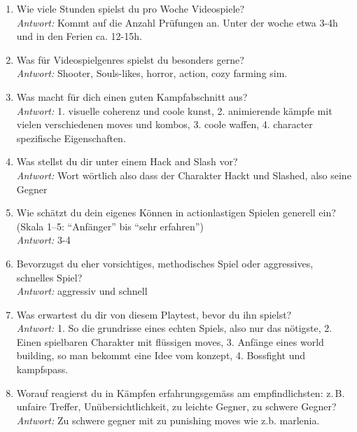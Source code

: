 \documentclass[../Main.tex]{subfiles}
\begin{document}
\begin{enumerate}[label=\textbf{P\arabic*}, leftmargin=1.5cm, itemsep=0.8em]
    \item Wie viele Stunden spielst du pro Woche Videospiele? \\
        \textit{Antwort:} Kommt auf die Anzahl Prüfungen an. Unter der woche etwa 3-4h und in den Ferien ca. 12-15h.

    \item Was für Videospielgenres spielst du besonders gerne? \\
        \textit{Antwort:} Shooter, Souls-likes, horror, action, cozy farming sim.

    \item Was macht für dich einen guten Kampfabschnitt aus? \\
        \textit{Antwort:} 1. visuelle coherenz und coole kunst, 2. animierende kämpfe mit vielen verschiedenen moves und kombos, 3. coole waffen, 4. character spezifische Eigenschaften.

    \item Was stellst du dir unter einem Hack and Slash vor? \\
        \textit{Antwort:} Wort wörtlich also dass der Charakter Hackt und Slashed, also seine Gegner

    \item Wie schätzt du dein eigenes Können in actionlastigen Spielen generell ein? (Skala 1--5: \enquote{Anfänger} bis \enquote{sehr erfahren}) \\
        \textit{Antwort:} 3-4

    \item Bevorzugst du eher vorsichtiges, methodisches Spiel oder aggressives, schnelles Spiel? \\
        \textit{Antwort:} aggressiv und schnell

    \item Was erwartest du dir von diesem Playtest, bevor du ihn spielst? \\
        \textit{Antwort:} 1. So die grundrisse eines echten Spiels, also nur das nötigste, 2. Einen spielbaren Charakter mit flüssigen moves, 3. Anfänge eines world building, so man bekommt eine Idee vom konzept, 4. Bossfight und kampfspass.

    \item Worauf reagierst du in Kämpfen erfahrungsgemäss am empfindlichsten: z.\,B. unfaire Treffer, Unübersichtlichkeit, zu leichte Gegner, zu schwere Gegner? \\
        \textit{Antwort:} Zu schwere gegner mit zu punishing moves wie z.b. marlenia.
\end{enumerate}
\end{document}
